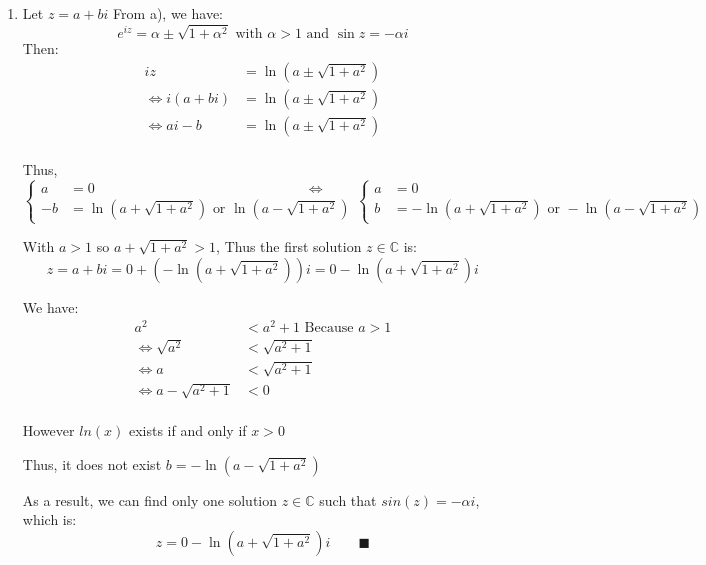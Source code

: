 \documentclass{article}
\begin{document}
\begin{enumerate}[label=({\alph*})]
            \item
            Let \(z = a + bi\)
            From a), we have:
            \[e^{iz} = \alpha \pm \sqrt{1 + \alpha^{2}} \text{ with \(\alpha > 1\) and \(\sin{z} = -\alpha i\)}\]
            Then:
            \begin{align*}
                iz &= \ln(a \pm \sqrt{1 + a^{2}})\\
                \Leftrightarrow i(a + bi) &= \ln(a \pm \sqrt{1 + a^{2}})\\
                \Leftrightarrow ai - b &= \ln(a \pm \sqrt{1 + a^{2}})\\
            \end{align*}

            Thus,
            \begin{equation}
                \begin{cases}
                    a &=  0  \quad \quad \quad \quad \quad \quad \quad \quad  \quad \quad \quad \quad \quad \quad \quad \Leftrightarrow \\
                    -b &= \ln(a + \sqrt{1 + a^{2}}) \text{ or } \ln(a - \sqrt{1 + a^{2}}) 
                \end{cases}
                \begin{cases}
                    a &=  0 \\
                    b &= -\ln(a + \sqrt{1 + a^{2}}) \text{ or } -\ln(a - \sqrt{1 + a^{2}}) \quad \label{3:b:1}
                \end{cases}
            \end{equation}
        

        With \(a > 1\) so \(a + \sqrt{1 + a^{2}} > 1\), Thus the first solution \(z \in \mathbb{C}\) is:
        \begin{equation}
            z = a + bi = 0 + (-\ln(a + \sqrt{1 + a^{2}}))i = 0 - \ln(a + \sqrt{1 + a^{2}})i 
        \end{equation}


        We have:
        \begin{align*}
            a^2 &< a^2 + 1 \text{ Because } a > 1\\
            \Leftrightarrow\sqrt{a^{2}} &< \sqrt{a^2 + 1}\\
            \Leftrightarrow a &< \sqrt{a^2 + 1}\\
            \Leftrightarrow a - \sqrt{a^2 + 1} &< 0 \\
        \end{align*}

        However \(ln(x)\) exists if and only if \(x > 0\)

        Thus, it does not exist \(b = -\ln(a - \sqrt{1 + a^{2}})\)

        As a result, we can find only one solution \(z \in \mathbb{C}\) such that \(sin(z) = -\alpha i\), which is:
        \[z = 0 - \ln(a + \sqrt{1 + a^{2}})i \quad \quad \blacksquare\]
        \end{enumerate}
\end{document}
